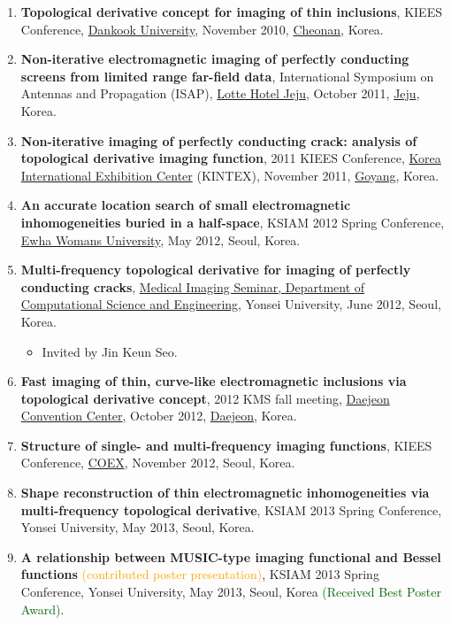\documentclass[10pt,A4]{article}
\begin{document}
\begin{enumerate}
\item\label{P-KIEES2010} \textbf{Topological derivative concept for imaging of thin inclusions}, KIEES Conference, \href{https://www.dankook.ac.kr/web/kor}{Dankook University}, November 2010, \href{https://www.cheonan.go.kr}{Cheonan}, Korea.
\item\label{P-ISAP2011} \textbf{Non-iterative electromagnetic imaging of perfectly conducting screens from limited range far-field data}, International Symposium on Antennas and Propagation (ISAP), \href{https://www.lottehotel.com/jeju-hotel/en.html}{Lotte Hotel Jeju}, October 2011, \href{https://www.jejusi.go.kr/}{Jeju}, Korea.
\item\label{P-KIEES2011} \textbf{Non-iterative imaging of perfectly conducting crack: analysis of topological derivative imaging function}, 2011 KIEES Conference, \href{https://www.kintex.com}{Korea International Exhibition Center} (KINTEX), November 2011, \href{http://www.goyang.go.kr/}{Goyang}, Korea.
\item\label{P-KSIAM2012} \textbf{An accurate location search of small electromagnetic inhomogeneities buried in a half-space}, KSIAM 2012 Spring Conference, \href{http://www.ewha.ac.kr/ewha/index.do}{Ewha Womans University}, May 2012, Seoul, Korea.
\item\label{P-MIS2012} \textbf{Multi-frequency topological derivative for imaging of perfectly conducting cracks}, \href{https://web.yonsei.ac.kr/misg/seminar29th.htm}{ Medical Imaging Seminar, Department of Computational Science and Engineering}, Yonsei University, June 2012, Seoul, Korea.
\begin{itemize}
\item Invited by Jin Keun Seo.
\end{itemize}
\item\label{P-KMS2012} \textbf{Fast imaging of thin, curve-like electromagnetic inclusions via topological derivative concept}, 2012 KMS fall meeting, \href{http://www.dcckorea.or.kr/}{Daejeon Convention Center}, October 2012, \href{https://www.daejeon.go.kr}{Daejeon}, Korea.
\item\label{P-KIEES2012} \textbf{Structure of single- and multi-frequency imaging functions}, KIEES Conference, \href{http://www.coex.co.kr/}{COEX}, November 2012, Seoul, Korea.
\item\label{P-KSIAM2013A} \textbf{Shape reconstruction of thin electromagnetic inhomogeneities via multi-frequency topological derivative}, KSIAM 2013 Spring Conference, Yonsei University, May 2013, Seoul, Korea.
\item\label{P-KSIAM2013B} \textbf{A relationship between MUSIC-type imaging functional and Bessel functions} \textcolor{orange}{(contributed poster presentation)}, KSIAM 2013 Spring Conference, Yonsei University, May 2013, Seoul, Korea \textcolor{darkgreen}{(Received Best Poster Award)}.

\end{enumerate}
\end{document}

